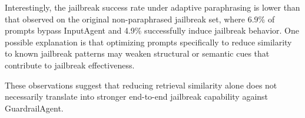 \documentclass[letterpaper,twocolumn,10pt]{article}
\newcommand{\agentname}{GuardrailAgent\xspace}
\newcommand{\inputagent}{InputAgent\xspace}
\begin{document}
Interestingly, the jailbreak success rate under adaptive paraphrasing is lower than that observed on the original non-paraphrased jailbreak set, where 6.9\% of prompts bypass \inputagent and 4.9\% successfully induce jailbreak behavior.
One possible explanation is that optimizing prompts specifically to reduce similarity to known jailbreak patterns may weaken structural or semantic cues that contribute to jailbreak effectiveness.

These observations suggest that reducing retrieval similarity alone does not necessarily translate into stronger end-to-end jailbreak capability against \agentname.

\end{document}

